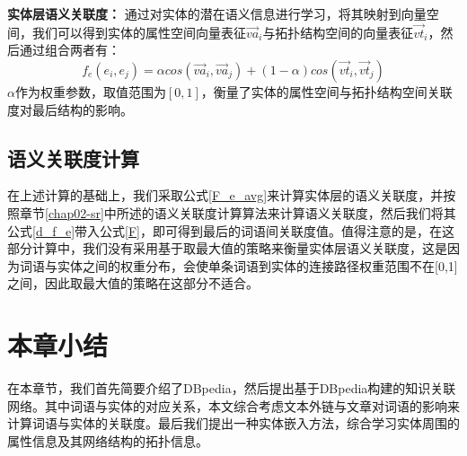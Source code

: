 \textbf{实体层语义关联度：}
通过对实体的潜在语义信息进行学习，将其映射到向量空间，我们可以得到实体的属性空间向量表征$\vec {va}_i$与拓扑结构空间的向量表征$\vec {vt}_i$，然后通过组合两者有：
\begin{equation}
    \label{d_f_e}
    f_e(e_i, e_j) = \alpha cos({\vec {va}_i, \vec {va}_j}) 
    + (1-\alpha)cos(\vec {vt}_i,\vec {vt}_j)
\end{equation}
\noindent $\alpha$作为权重参数，取值范围为$[0,1]$，衡量了实体的属性空间与拓扑结构空间关联度对最后结构的影响。

\subsection{语义关联度计算}
在上述计算的基础上，我们采取公式\ref{F_e_avg}来计算实体层的语义关联度，并按照章节\ref{chap02-sr}中所述的语义关联度计算算法来计算语义关联度，然后我们将其公式\ref{d_f_e}带入公式\ref{F}，即可得到最后的词语间关联度值。值得注意的是，在这部分计算中，我们没有采用基于取最大值的策略来衡量实体层语义关联度，这是因为词语与实体之间的权重分布，会使单条词语到实体的连接路径权重范围不在[0,1]之间，因此取最大值的策略在这部分不适合。

\section{本章小结}

在本章节，我们首先简要介绍了DBpedia，然后提出基于DBpedia构建的知识关联网络。其中词语与实体的对应关系，本文综合考虑文本外链与文章对词语的影响来计算词语与实体的关联度。最后我们提出一种实体嵌入方法，综合学习实体周围的属性信息及其网络结构的拓扑信息。

